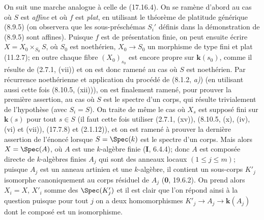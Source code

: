 On suit une marche analogue à celle de (17.16.4). On se ramène d'abord au cas où $S$ est \emph{affine} et où $f$ est \emph{plat}, en utilisant le théorème de platitude générique (8.9.5) (on observera que les sous-préschémas $S_i'$ définis dans la démonstration de (8.9.5) sont affines). Puisque $f$ est de présentation finie, on peut ensuite écrire $X=X_0\times_{S_0}S$, où $S_0$ est noethérien, $X_0\to S_0$ un morphisme de type fini et plat (11.2.7); en outre chaque fibre $(X_0)_{s_0}$ est encore propre sur $\boldsymbol{k}(s_0)$, comme il résulte de (2.7.1, (vii)) et on est donc ramené au cas où $S$ est noethérien. Par récurrence noethérienne et application du procédé de (8.1.2, \emph{a)}) (en utilisant aussi cette fois (8.10.5, (xii))), on est finalement ramené, pour prouver la première assertion, au cas où $S$ est le spectre d'un corps, qui résulte trivialement de l'hypothèse (avec $S_i=S$). On traite de même le cas où $X_s$ est supposé fini sur $\boldsymbol{k}(s)$ pour tout $s\in S$ (il faut cette fois utiliser (2.7.1, (xv)), (8.10.5, (x), (iv), (vi) et (vii)), (17.7.8) et (2.1.12)), et on est ramené à prouver la dernière assertion de l'énoncé lorsque $S=\Spec(k)$ est le spectre d'un corps. Mais alors $X=\Spec(A)$, où $A$ est une $k$-algèbre finie (\textbf{I}, 6.4.4); donc $A$ est composée directe de $k$-algèbres finies $A_j$ qui sont des anneaux locaux $(1\leq j\leq m)$; puisque $A_j$ est un anneau artinien et une
$k$-algèbre, il contient un sous-corps $K'_j$ isomorphe canoniquement au corps résiduel de $A_j$ (\textbf{0}, 19.6.2). On prend alors $X_i=X$, $X'_i$ somme des $\Spec(K'_j)$ et il est clair que l'on répond ainsi à la question puisque pour tout $j$ on a deux homomorphismes $K'_j\to A_j\to\boldsymbol{k}(A_j)$ dont le composé est un isomorphisme.

